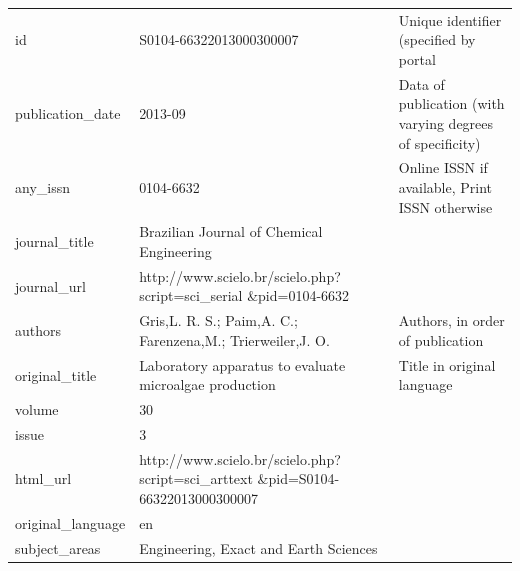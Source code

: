 \begin{longtable}{@{}lp{5cm}p{6cm}@{}}
\bottomrule
\endlastfoot
id                 & S0104-66322013000300007                                                          & Unique identifier (specified by portal                               \\
publication\_date  & 2013-09                                                                          & Data of publication (with varying degrees of specificity)            \\
any\_issn          & 0104-6632                                                                        & Online ISSN if available, Print ISSN otherwise                       \\
journal\_title     & Brazilian Journal of Chemical Engineering                                        &                                                                      \\
journal\_url       & http://www.scielo.br{\slash}scielo.php?script=sci\_serial \&pid=0104-6632                &                                                               \\
authors            & Gris,L. R. S.; Paim,A. C.; Farenzena,M.; Trierweiler,J. O.                         & Authors, in order of publication                                    \\
original\_title    & Laboratory apparatus to evaluate microalgae production                           & Title in original language                                           \\
volume             & 30                                                                               &                                                                      \\
issue              & 3                                                                                &                                                                      \\
html\_url          & http://www.scielo.br{\slash}scielo.php?script=sci\_arttext \&pid=S0104-66322013000300007 &                                                              \\
original\_language & en                                                                               &                                                                      \\
subject\_areas     & Engineering, Exact and Earth Sciences                                      &                                                                           \\

\end{longtable}
